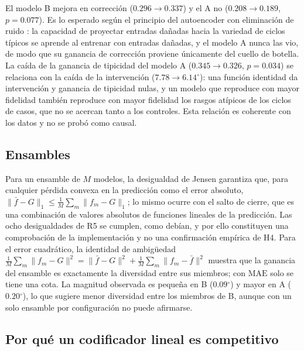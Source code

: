 \documentclass[11pt,a4paper]{article}
\newcommand{\gr}{$^{\circ}$}
\newcommand{\Mae}{\mathrm{MAE}}
\begin{document}
El modelo B mejora en corrección ($0.296\to0.337$) y el A no ($0.208\to0.189$, $p=0.077$). Es lo esperado según el principio del autoencoder con eliminación de ruido \cite{vincent2008}: la capacidad de proyectar entradas dañadas hacia la variedad de ciclos típicos se aprende al entrenar con entradas dañadas, y el modelo A nunca las vio, de modo que su ganancia de corrección proviene únicamente del cuello de botella. La caída de la ganancia de tipicidad del modelo A ($0.345\to0.326$, $p=0.034$) se relaciona con la caída de la intervención ($7.78\to6.14$\gr): una función identidad da intervención y ganancia de tipicidad nulas, y un modelo que reproduce con mayor fidelidad también reproduce con mayor fidelidad los rasgos atípicos de los ciclos de casos, que no se acercan tanto a los controles. Esta relación es coherente con los datos y no se probó como causal.

\subsection{Ensambles}

Para un ensamble de $M$ modelos, la desigualdad de Jensen garantiza que, para cualquier pérdida convexa en la predicción como el error absoluto, $\|\bar f-G\|_1\le\frac1M\sum_m\|f_m-G\|_1$; lo mismo ocurre con el salto de cierre, que es una combinación de valores absolutos de funciones lineales de la predicción. Las ocho desigualdades de R5 se cumplen, como debían, y por ello constituyen una comprobación de la implementación y no una confirmación empírica de H4. Para el error cuadrático, la identidad de ambigüedad $\frac1M\sum_m\|f_m-G\|^2=\|\bar f-G\|^2+\frac1M\sum_m\|f_m-\bar f\|^2$ \cite{krogh1995} muestra que la ganancia del ensamble es exactamente la diversidad entre sus miembros; con $\Mae$ solo se tiene una cota. La magnitud observada es pequeña en B ($0.09$\gr) y mayor en A ($0.20$\gr), lo que sugiere menor diversidad entre los miembros de B, aunque con un solo ensamble por configuración no puede afirmarse.

\subsection{Por qué un codificador lineal es competitivo}
\end{document}
